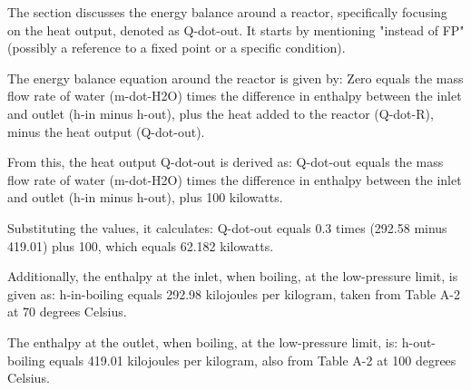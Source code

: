 The section discusses the energy balance around a reactor, specifically focusing on the heat output, denoted as Q-dot-out. It starts by mentioning "instead of FP" (possibly a reference to a fixed point or a specific condition).

The energy balance equation around the reactor is given by:
Zero equals the mass flow rate of water (m-dot-H2O) times the difference in enthalpy between the inlet and outlet (h-in minus h-out), plus the heat added to the reactor (Q-dot-R), minus the heat output (Q-dot-out).

From this, the heat output Q-dot-out is derived as:
Q-dot-out equals the mass flow rate of water (m-dot-H2O) times the difference in enthalpy between the inlet and outlet (h-in minus h-out), plus 100 kilowatts.

Substituting the values, it calculates:
Q-dot-out equals 0.3 times (292.58 minus 419.01) plus 100, which equals 62.182 kilowatts.

Additionally, the enthalpy at the inlet, when boiling, at the low-pressure limit, is given as:
h-in-boiling equals 292.98 kilojoules per kilogram, taken from Table A-2 at 70 degrees Celsius.

The enthalpy at the outlet, when boiling, at the low-pressure limit, is:
h-out-boiling equals 419.01 kilojoules per kilogram, also from Table A-2 at 100 degrees Celsius.
